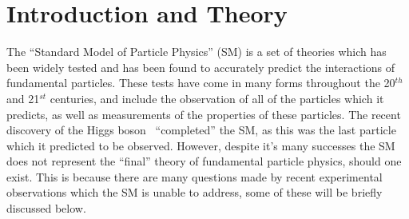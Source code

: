 
\chapter{Introduction and Theory} \label{chap:Theory} %

\newcommand{\Dmq}{\Delta m^2}
\newcommand{\eVq}{\ensuremath{\text{eV}^2}}

\graphicspath{{Theory/Figs/Raster/}{Theory/Figs/PDF/}{Theory/Figs/Vector/}}





The ``Standard Model of Particle Physics'' (SM) is a set of theories which has been widely tested and has been found to accurately predict the interactions of fundamental particles. These tests have come in many forms throughout the 20$^{th}$ and 21$^{st}$ centuries, and include the observation of all of the particles which it predicts, as well as measurements of the properties of these particles. The recent discovery of the Higgs boson~\citep{HiggsAtlas, HiggsCMS} ``completed'' the SM, as this was the last particle which it predicted to be observed. However, despite it's many successes the SM does not represent the ``final'' theory of fundamental particle physics, should one exist. This is because there are many questions made by recent experimental observations which the SM is unable to address, some of these will be briefly discussed below. \\

